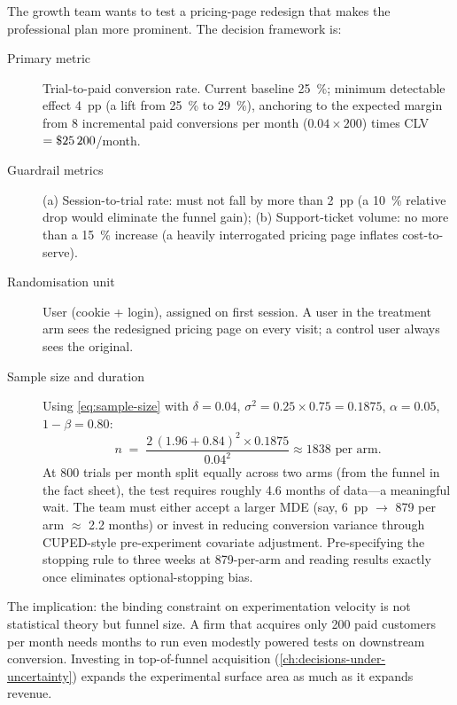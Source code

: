 \begin{example}
The growth team wants to test a pricing-page redesign that makes the professional plan more
prominent. The decision framework is:

\begin{description}
  \item[Primary metric] Trial-to-paid conversion rate. Current baseline \qty{25}{\percent};
    minimum detectable effect \qty{4}{pp} (a lift from \qty{25}{\percent} to \qty{29}{\percent}),
    anchoring to the expected margin from \num{8} incremental paid conversions per month
    (\(0.04\times 200\)) times  CLV \(= \$\num{25200}\)/month.
  \item[Guardrail metrics] (a) Session-to-trial rate: must not fall by more than \qty{2}{pp}
    (a \qty{10}{\percent} relative drop would eliminate the funnel gain); (b) Support-ticket
    volume: no more than a \qty{15}{\percent} increase (a heavily interrogated pricing page
    inflates cost-to-serve).
  \item[Randomisation unit] User (cookie + login), assigned on first session. A user in the
    treatment arm sees the redesigned pricing page on every visit; a control user always sees
    the original.
  \item[Sample size and duration] Using \cref{eq:sample-size} with \(\delta=0.04\),
    \(\sigma^2=0.25\times 0.75=0.1875\), \(\alpha=0.05\), \(1-\beta=0.80\):
    \[
      n \;=\; \frac{2\,(1.96+0.84)^{2}\times 0.1875}{0.04^{2}} \approx \num{1838}
        \text{ per arm.}
    \]
    At \num{800} trials per month split equally across two arms (from the funnel in the
    fact sheet), the test requires roughly \num{4.6} months of data---a meaningful wait. The team must either accept a larger MDE
    (say, \qty{6}{pp} \(\to\) \num{879} per arm \(\approx\) 2.2 months) or invest in reducing
    conversion variance through CUPED-style pre-experiment covariate adjustment. Pre-specifying
    the stopping rule to three weeks at \num{879}-per-arm and reading results exactly once
    eliminates optional-stopping bias.
\end{description}

The implication: the binding constraint on experimentation velocity is not statistical theory
but funnel size. A firm that acquires only \num{200} paid customers per month needs months to
run even modestly powered tests on downstream conversion. Investing in top-of-funnel
acquisition (\cref{ch:decisions-under-uncertainty}) expands the experimental surface area as
much as it expands revenue.
\end{example}

